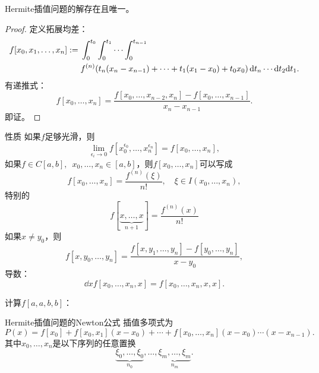 \begin{theorem}
    {}{}
    Hermite插值问题的解存在且唯一。
\end{theorem}

\begin{proof}
    定义拓展均差：
    \begin{equation}
        \begin{aligned}
            f[x_0,x_1,\ldots,x_n]:={}&\int_0^{t_0}\int_0^{t_1}\cdots\int_0^{t_{n-1}}\\
            &f^{(n)}(t_n(x_n-x_{n-1})+\cdots+t_1(x_1-x_0)+t_0x_0)\mathop{}\!\mathrm{d} t_n\cdots\mathrm{d} t_2\mathrm{d} t_1.
        \end{aligned}
    \end{equation}
    有递推式：
    \begin{equation}
        f[x_0,\ldots,x_n]=\frac{f[x_0,\ldots,x_{n-2},x_n]-f[x_0,\ldots,x_{n-1}]}{x_n-x_{n-1}}.
    \end{equation}
    即证。
\end{proof}
\begin{theorem}
    {性质}{}
    如果$f$足够光滑，则
    \begin{equation}
        \lim_{\epsilon_i\to0}f[x_0^{\epsilon_0},\ldots,x_n^{\epsilon_n}]=f[x_0,\ldots,x_n],
    \end{equation}
    如果$f\in C[a,b],\enspace x_0,\ldots,x_n\in[a,b]$，则$f[x_0,\ldots,x_n]$可以写成
    \begin{equation}
        f[x_0,\ldots,x_n]=\frac{f^{(n)}(\xi)}{n!},\quad\xi\in I(x_0,\ldots,x_n),
    \end{equation}
    特别的
    \begin{equation}
        f[\underbrace{x,\ldots,x}_{n+1}]=\frac{f^{(n)}(x)}{n!}
    \end{equation}
    如果$x\neq y_0$，则
    \begin{equation}
        f[x,y_0,\ldots,y_n]=\frac{f[x,y_1,\ldots,y_n]-f[y_0,\ldots,y_n]}{x-y_0},
    \end{equation}
    导数：
    \begin{equation}
        \dd xf[x_0,\ldots,x_n,x]=f[x_0,\ldots,x_n,x,x].
    \end{equation}
\end{theorem}

\begin{example}
    {}{}
    计算$f[a,a,b,b]$：
\end{example}

\begin{theorem}
    {Hermite插值问题的Newton公式}{}
    插值多项式为
    \begin{equation}
        P(x)=f[x_0]+f[x_0,x_1](x-x_0)+\cdots+f[x_0,\ldots,x_n](x-x_0)\cdots(x-x_{n-1}).
    \end{equation}
    其中$x_0,\ldots,x_n$是以下序列的任意置换
    \[
        \underbrace{\xi_0,\ldots,\xi_0}_{n_0},\ldots,\underbrace{\xi_m,\ldots,\xi_m}_{n_m}.
    \]
\end{theorem}

